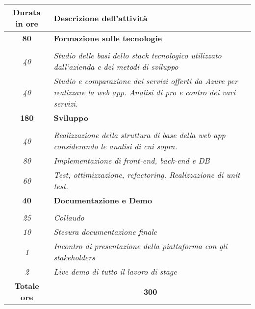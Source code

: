 

\begin{tabularx}{\textwidth}{|c|X|}
	\hline
	\textbf{Durata in ore} & \textbf{Descrizione dell'attività} \\\hline
	
	\textbf{80} & \textbf{Formazione sulle tecnologie} \\ \hdashline
        \multirow{2}{0cm}\\
            \textit{40} &
            \textit{Studio delle basi dello stack tecnologico utilizzato dall'azienda e dei metodi di sviluppo} \\
            \textit{40} &
            \textit{Studio e comparazione dei servizi offerti da Azure per realizzare la web app. Analisi di pro e contro dei vari servizi.} \\
    \hline
    
    \textbf{180} & \textbf{Sviluppo} \\ \hdashline 
    \multirow{3}{0cm}\\ 
    \textit{40} & 
    \textit{Realizzazione della struttura di base della web app considerando le analisi di cui sopra.} \\
    \textit{80} & 
    \textit{Implementazione di front-end, back-end e DB} \\
    \textit{60} & 
    \textit{Test, ottimizzazione, refactoring. Realizzazione di unit test.} \\
    \hline
    
    \textbf{40} & \textbf{Documentazione e Demo}  \\ \hdashline 
    \multirow{4}{0cm}\\ 
    \textit{25} & 
    \textit{Collaudo} \\
    \textit{10} & 
    \textit{Stesura documentazione finale} \\
    \textit{1} & 
    \textit{Incontro di presentazione della piattaforma con gli stakeholders} \\
    \textit{2} & 
    \textit{Live demo di tutto il lavoro di stage} \\
    \hline
	
	\textbf{Totale ore} & \multicolumn{1}{|c|}{\textbf{300}} \\\hline
	
	
\end{tabularx}